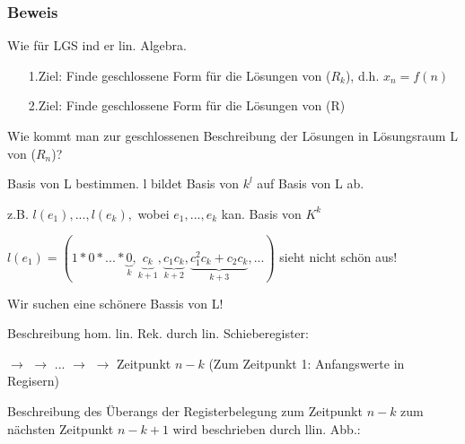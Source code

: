 \subsubsection*{Beweis}
Wie für LGS ind er lin. Algebra.

\begin{itemize}
	\item[1.Ziel:] Finde geschlossene Form für die Lösungen von ($R_k$), d.h. $x_n=f(n)$
	\item[2.Ziel:] Finde geschlossene Form für die Lösungen von (R) 
\end{itemize}

Wie kommt man zur geschlossenen Beschreibung der Lösungen in Lösungsraum L von ($R_n$)?

Basis von L bestimmen. l bildet Basis von $k^l$ auf Basis von L ab.

z.B. $l(e_1),...,l(e_k),$ wobei $e_1, ..., e_k$ kan. Basis von $K^k$

$l(e_1)= (1*0*...*\underbrace{0}_k, \underbrace{c_k}_{k+1},\underbrace{c_1c_k}_{k+2}, \underbrace{c_1^2c_k+c_2c_k}_{k+3},...)$ sieht nicht schön aus!

Wir suchen eine schönere Bassis von L!

Beschreibung hom. lin. Rek. durch lin. Schieberegister:

 $\rightarrow$  $\rightarrow$ ... $\rightarrow$  $\rightarrow$ \qquad \qquad Zeitpunkt $n-k$ (Zum Zeitpunkt 1: Anfangswerte in Regisern)

Beschreibung des Überangs der Registerbelegung zum Zeitpunkt $n-k$ zum nächsten Zeitpunkt $n-k+1$ wird beschrieben durch llin. Abb.:

